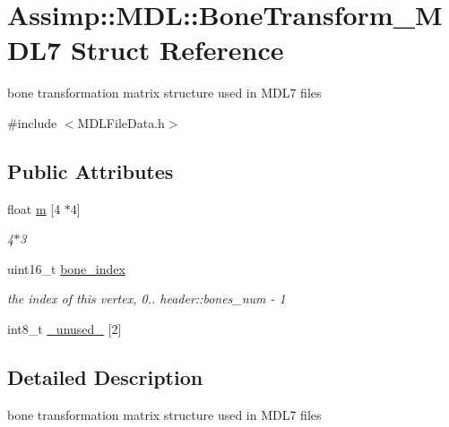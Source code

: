 \hypertarget{struct_assimp_1_1_m_d_l_1_1_bone_transform___m_d_l7}{\section{Assimp\+:\+:M\+D\+L\+:\+:Bone\+Transform\+\_\+\+M\+D\+L7 Struct Reference}
\label{struct_assimp_1_1_m_d_l_1_1_bone_transform___m_d_l7}
}


bone transformation matrix structure used in M\+D\+L7 files  




{\ttfamily \#include $<$M\+D\+L\+File\+Data.\+h$>$}

\subsection*{Public Attributes}
\begin{DoxyCompactItemize}
\item 
\hypertarget{struct_assimp_1_1_m_d_l_1_1_bone_transform___m_d_l7_a9e6c20d9dc784554f862a010a25f6bab}{float \hyperlink{struct_assimp_1_1_m_d_l_1_1_bone_transform___m_d_l7_a9e6c20d9dc784554f862a010a25f6bab}{m} \mbox{[}4 $\ast$4\mbox{]}}\label{struct_assimp_1_1_m_d_l_1_1_bone_transform___m_d_l7_a9e6c20d9dc784554f862a010a25f6bab}

\begin{DoxyCompactList}\small\item\em 4$\ast$3 \end{DoxyCompactList}\item 
\hypertarget{struct_assimp_1_1_m_d_l_1_1_bone_transform___m_d_l7_abc27cccf59f6cdf5d050d592e1cf310b}{uint16\+\_\+t \hyperlink{struct_assimp_1_1_m_d_l_1_1_bone_transform___m_d_l7_abc27cccf59f6cdf5d050d592e1cf310b}{bone\+\_\+index}}\label{struct_assimp_1_1_m_d_l_1_1_bone_transform___m_d_l7_abc27cccf59f6cdf5d050d592e1cf310b}

\begin{DoxyCompactList}\small\item\em the index of this vertex, 0.. header\+::bones\+\_\+num -\/ 1 \end{DoxyCompactList}\item 
int8\+\_\+t \hyperlink{struct_assimp_1_1_m_d_l_1_1_bone_transform___m_d_l7_a884f237263bf3cf6dbcb487b0385b6db}{\+\_\+unused\+\_\+} \mbox{[}2\mbox{]}
\end{DoxyCompactItemize}


\subsection{Detailed Description}
bone transformation matrix structure used in M\+D\+L7 files 

